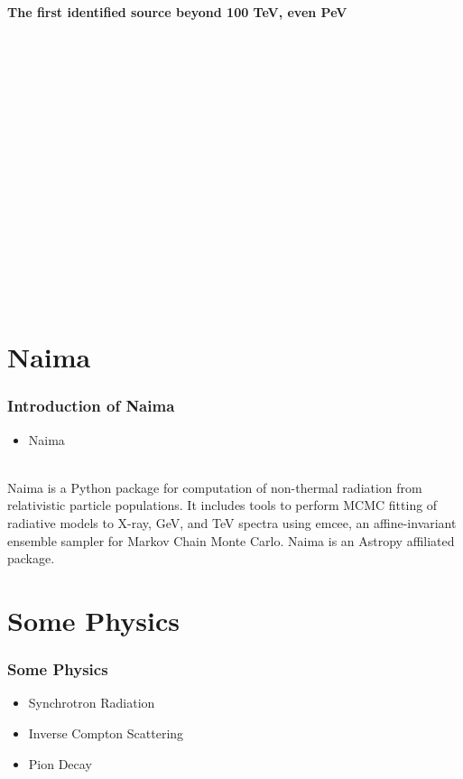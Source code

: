 \documentclass[9pt, mathserif]{beamer}
\begin{document}
\begin{frame}
            \noindent \textbf{The first identified source beyond 100 TeV, even PeV}
            \phantom{0}\\
            \phantom{0}\\
            \phantom{0}\\
            \phantom{0}\\
            \phantom{0}\\
            \phantom{0}\\
            \phantom{0}\\
            \phantom{0}\\
            \phantom{0}\\
            \phantom{0}\\
            \phantom{0}\\
            \phantom{0}\\
            \phantom{0}\\
            \phantom{0}\\
            \phantom{0}\\
            \phantom{0}\\
            \phantom{0}\\
        \end{frame}

    \section{Naima}
        \begin{frame}
            \frametitle{Introduction of Naima}
            \begin{itemize}
                \item \huge{Naima}
            \end{itemize}
            
            \phantom{0}\\

            Naima is a Python package for computation of non-thermal radiation from relativistic particle populations. It includes tools to perform MCMC fitting of radiative models to X-ray, GeV, and TeV spectra using emcee, an affine-invariant ensemble sampler for Markov Chain Monte Carlo. Naima is an Astropy affiliated package\cite{naima}.
        \end{frame}

    \section{Some Physics}
        \begin{frame}
            \frametitle{Some Physics}
            \huge{
            \begin{itemize}
                \item Synchrotron Radiation
                \item Inverse Compton Scattering
                \item Pion Decay
            \end{itemize}}
        \end{frame}
\end{document}
